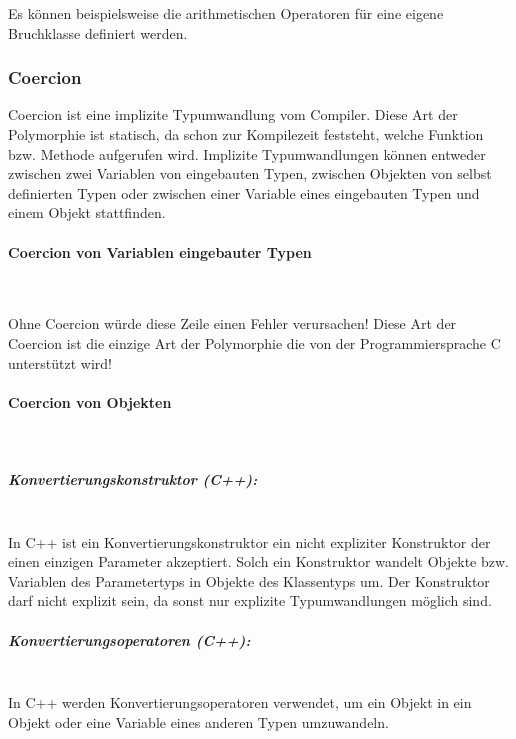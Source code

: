 				Es können beispielsweise die arithmetischen Operatoren für eine eigene Bruchklasse definiert werden.
		
		
		\subsubsection{Coercion}
			Coercion ist eine implizite Typumwandlung vom Compiler. Diese Art der Polymorphie ist statisch, da schon zur
			Kompilezeit feststeht, welche Funktion bzw. Methode aufgerufen wird. Implizite Typumwandlungen können entweder
			zwischen zwei Variablen von eingebauten Typen, zwischen Objekten von selbst definierten Typen oder zwischen
			einer Variable eines eingebauten Typen und einem Objekt stattfinden. 
			
			\paragraph{Coercion von Variablen eingebauter Typen}\mbox{}\\
				\UseRawInputEncoding{}
				
				Ohne Coercion würde diese Zeile einen Fehler verursachen! Diese Art der Coercion ist die einzige Art der
				Polymorphie die von der Programmiersprache C unterstützt wird!
			
			\paragraph{Coercion von Objekten}\mbox{}\\
				\subparagraph*{Konvertierungskonstruktor (C++):}\mbox{}\\
					In C++ ist ein Konvertierungskonstruktor ein nicht expliziter Konstruktor der einen einzigen Parameter
					akzeptiert. Solch ein Konstruktor wandelt Objekte bzw. Variablen des Parametertyps in Objekte des
					Klassentyps um. Der Konstruktor darf nicht explizit sein, da sonst nur explizite Typumwandlungen möglich
					sind.
					
					\UseRawInputEncoding{}
				
				\subparagraph*{Konvertierungsoperatoren (C++):}\mbox{}\\
					In C++ werden Konvertierungsoperatoren verwendet, um ein Objekt in ein Objekt oder eine Variable eines
					anderen Typen umzuwandeln.
					
